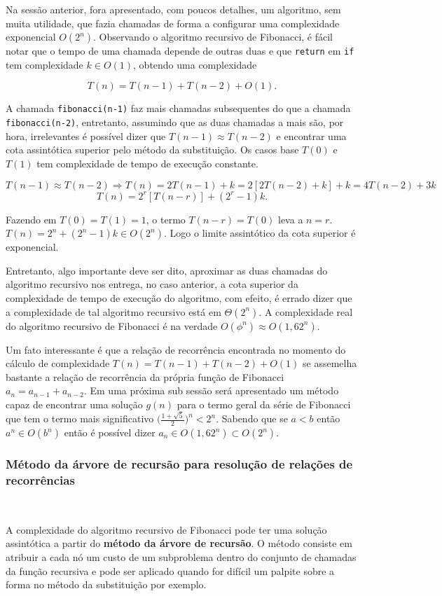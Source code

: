Na sessão anterior, fora apresentado, com poucos detalhes, um algoritmo, sem muita utilidade, que fazia chamadas de forma a configurar uma complexidade exponencial $O(2^n)$. Observando o algoritmo recursivo de Fibonacci, é fácil notar que o tempo de uma chamada depende de outras duas e que \texttt{return} em \texttt{if} tem complexidade $k \in O(1)$, obtendo uma complexidade

\[T(n) = T(n-1) + T(n-2) + O(1).\]

A chamada \texttt{fibonacci(n-1)} faz mais chamadas subsequentes do que a chamada \texttt{fibonacci(n-2)}, entretanto, assumindo que as duas chamadas a mais são, por hora, irrelevantes é possível dizer que $T(n-1)\approx T(n-2)$ e encontrar uma cota assintótica superior pelo método da substituição. Os casos base $T(0)$ e $T(1)$ tem complexidade de tempo de execução constante.

\[T(n-1)\approx T(n-2) \Rightarrow T(n) = 2T(n-1) + k = 2[2T(n-2)+k]+k = 4T(n-2) + 3k\]
\[T(n) = 2^r[T(n-r)]+(2^{r}-1)k.\]

Fazendo em $T(0)=T(1)=1$, o termo $T(n-r)=T(0)$ leva a $n=r$. $T(n) = 2^n + (2^n-1)k \in O(2^n)$. Logo o limite assintótico da cota superior é exponencial.

Entretanto, algo importante deve ser dito, aproximar as duas chamadas do algoritmo recursivo nos entrega, no caso anterior, a cota superior da complexidade de tempo de execução do algoritmo, com efeito, é errado dizer que a complexidade de tal algoritmo recursivo está em $\Theta(2^n)$. A complexidade real do algoritmo recursivo de Fibonacci é na verdade $O(\phi^n)\approx O(1,62^n)$.

Um fato interessante é que a relação de recorrência encontrada no momento do cálculo de complexidade $T(n)=T(n-1)+T(n-2)+O(1)$ se assemelha bastante a relação de recorrência da própria função de Fibonacci $a_n=a_{n-1}+a_{n-2}$. Em uma próxima sub sessão será apresentado um método capaz de encontrar uma solução $g(n)$ para o termo geral da série de Fibonacci que tem o termo mais significativo $\Bigr(\frac{1+\sqrt{5}}{2}\Bigr)^n < 2^n$. Sabendo que se $a<b$ então $a^n \in O(b^n)$ então é possível dizer $a_n \in O(1,62^n) \subset O(2^n)$.

\subsubsection{Método da árvore de recursão para resolução de relações de recorrências}
\

A complexidade do algoritmo recursivo de Fibonacci pode ter uma solução assintótica a partir do \textbf{método da árvore de recursão}. O método consiste em atribuir a cada nó um custo de um subproblema dentro do conjunto de chamadas da função recursiva e pode ser aplicado quando for difícil um palpite sobre a forma no método da substituição por exemplo.

